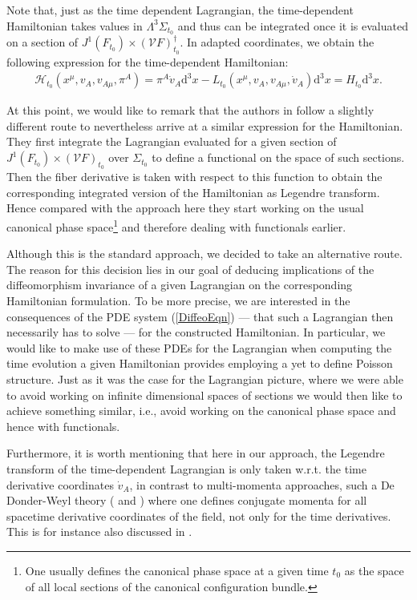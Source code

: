 Note that, just as the time dependent Lagrangian, the time-dependent Hamiltonian takes values in $\Lambda^3\Sigma_{t_0}$ and thus can be integrated once it is evaluated on a section of  $J^1(F_{t_0}) \times (\mathcal{V}F)_{t_0}^{\dagger}$.
In adapted coordinates, we obtain the following expression for the time-dependent Hamiltonian:
\begin{align}
    \mathcal{H}_{t_0}(x^\mu, v_A, v_{A\mu},\pi^A) = \pi^A \dot{v}_A \mathrm{d}^3x - L_{t_0}(x^\mu,v_A,v_{A\mu},\dot{v}_A) \mathrm{d}^3x = H_{t_0} \mathrm{d}^3x.
\end{align}

At this point, we would like to remark that the authors in \cite{2004math.ph..11032G} follow a slightly different route to nevertheless arrive at a similar expression for the Hamiltonian. They first integrate the Lagrangian evaluated for a given section of $J^1(F_{t_0}) \times (\mathcal{V}F)_{t_0}$ over $\Sigma_{t_0}$ to define a functional on the space of such sections. Then the fiber derivative is taken with respect to this function to obtain the corresponding integrated version of the Hamiltonian as Legendre transform. 
Hence compared with the approach here they start working on the usual canonical phase space\footnote{One usually defines the canonical phase space at a given time $t_0$ as the space of all local sections of the canonical configuration bundle.} and therefore dealing with functionals earlier. 

Although this is the standard approach, we decided to take an alternative route. The reason for this decision lies in our goal of deducing implications of the diffeomorphism invariance of a given Lagrangian on the corresponding Hamiltonian formulation. To be more precise, we are interested in the consequences of the PDE system (\ref{DiffeoEqn}) --- that such a Lagrangian then necessarily has to solve --- for the constructed Hamiltonian. In particular, we would like to make use of these PDEs for the Lagrangian when computing the time evolution a given Hamiltonian provides employing a yet to define Poisson structure. Just as it was the case for the Lagrangian picture, where we were able to avoid working on infinite dimensional spaces of sections we would then like to achieve something similar, i.e., avoid working on the canonical phase space and hence with functionals.

Furthermore, it is worth mentioning that here in our approach, the Legendre transform of the time-dependent Lagrangian is only taken w.r.t. the time derivative coordinates $\dot{v}_A$, in contrast to multi-momenta approaches, such a De Donder-Weyl theory (\cite{deDonder} and \cite{Weyl}) where one defines conjugate momenta for all spacetime derivative coordinates of the field, not only for the time derivatives. This is for instance also discussed in \cite{1998physics...1019G}. 

